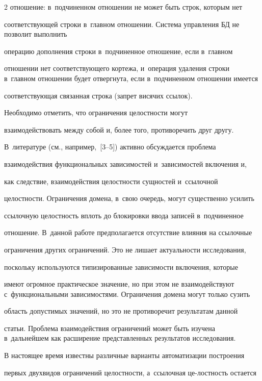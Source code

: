 \begin{multicols}{2}
отношение: в~подчиненном отношении не может быть строк, которым нет

соответствующей строки в~главном отношении. Система управ\-ле\-ния БД не позволит выполнить

операцию дополнения строки в~подчиненное отношение, если в~главном

отношении нет соответствующего кортежа, и~операция удаления строки в~главном отношении будет отвергнута, если в~подчиненном отношении имеется

соответствующая связанная строка (запрет висячих ссылок).



  Необходимо отметить, что ограничения целостности могут

взаимодействовать между собой и, более того, противоречить друг другу.

В~литературе (см., например,~[3--5]) активно об\-суж\-да\-ет\-ся проблема

взаимодействия функциональных зависимостей и~зависимостей включения и,

как следствие, взаимодействия целостности сущностей и~ссылочной

целостности. Ограничения домена, в~свою очередь, могут существенно усилить

ссылочную целостность вплоть до блокировки ввода записей в~подчиненное

отношение. В~данной работе предполагается отсутствие влияния на ссылочные

ограничения других ограничений. Это не лишает актуальности исследования,

поскольку используются типизированные зависимости включения, которые

имеют огромное практическое значение, но при этом не вза\-и\-мо\-дей\-ст\-ву\-ют с~функциональными зависимостями. Ограничения домена могут только сузить

область допустимых значений, но это не противоречит результатам данной

статьи. Проблема взаимодействия ограничений может быть изучена в~дальнейшем как расширение представленных результатов исследования.



  В настоящее время известны различные варианты автоматизации построения

первых двух\linebreak видов ограничений целостности, а~ссылочная це-\linebreak ло\-стность остается


\end{multicols}
